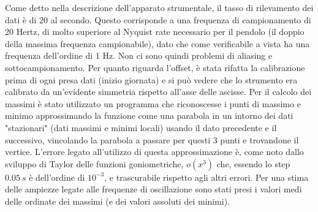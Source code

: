 Come detto nella descrizione dell'apparato strumentale, il tasso di rilevamento dei dati è di 20 al secondo. Questo corrisponde a una
frequenza di campionamento di 20 Hertz, di molto superiore al 
Nyquist rate necessario per il pendolo (il doppio della massima frequenza
campionabile), dato che come verificabile a vista ha una frequenza dell'ordine di 1 Hz. 
Non ci sono quindi problemi di aliasing e sottocampionamento.
Per quanto riguarda l'offset, è stata rifatta la calibrazione prima di ogni presa dati (inizio giornata) e si può vedere che lo strumento era
 calibrato da un'evidente simmetria rispetto all'asse delle ascisse.
Per il calcolo dei massimi è stato utilizzato un programma che riconoscesse i punti di massimo e minimo approssimando
la funzione come una parabola in un intorno dei dati "stazionari" (dati massimi e minimi locali) usando il dato precedente e il successivo,
vincolando la parabola a passare per questi 3 punti e trovandone il vertice. L'errore legato all'utilizzo
 di questa approssimazione è, come noto dallo sviluppo di Taylor delle funzioni goniometriche, $o(x^3)$ che, essendo lo step $0.05\ s$ è dell'ordine di $10^{-3}$,
  e trascurabile rispetto agli altri errori.
 Per una stima delle ampiezze legate alle frequenze di oscillazione sono stati presi i valori medi delle ordinate dei massimi (e dei valori assoluti dei minimi).

